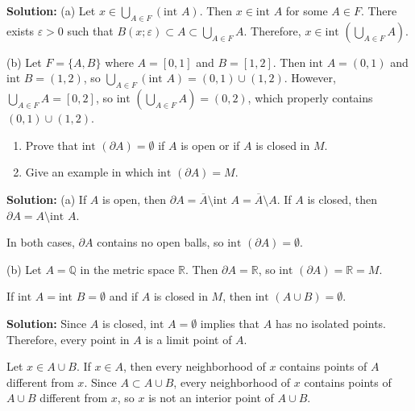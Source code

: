 \textbf{Solution:} 
(a) Let $x \in \bigcup_{A \in F} (\text{int } A)$. Then $x \in \text{int } A$ for some $A \in F$. There exists $\varepsilon > 0$ such that $B(x;\varepsilon) \subset A \subset \bigcup_{A \in F} A$. Therefore, $x \in \text{int }(\bigcup_{A \in F} A)$.

(b) Let $F = \{A, B\}$ where $A = [0,1]$ and $B = [1,2]$. Then $\text{int } A = (0,1)$ and $\text{int } B = (1,2)$, so $\bigcup_{A \in F} (\text{int } A) = (0,1) \cup (1,2)$. However, $\bigcup_{A \in F} A = [0,2]$, so $\text{int }(\bigcup_{A \in F} A) = (0,2)$, which properly contains $(0,1) \cup (1,2)$.

\begin{problembox}
\begin{enumerate}[label=\alph*)]
\item Prove that \(\text{int } (\partial A) = \emptyset\) if \( A \) is open or if \( A \) is closed in \( M \).
\item Give an example in which \(\text{int } (\partial A) = M\).
\end{enumerate}
\end{problembox}

\textbf{Solution:} 
(a) If $A$ is open, then $\partial A = \overline{A} \setminus \text{int } A = \overline{A} \setminus A$. If $A$ is closed, then $\partial A = A \setminus \text{int } A$.

In both cases, $\partial A$ contains no open balls, so $\text{int } (\partial A) = \emptyset$.

(b) Let $A = \mathbb{Q}$ in the metric space $\mathbb{R}$. Then $\partial A = \mathbb{R}$, so $\text{int } (\partial A) = \mathbb{R} = M$.

\begin{problembox}
If \(\text{int } A = \text{int } B = \emptyset\) and if \(A\) is closed in \(M\), then \(\text{int } (A \cup B) = \emptyset\).
\end{problembox}

\textbf{Solution:} Since $A$ is closed, $\text{int } A = \emptyset$ implies that $A$ has no isolated points. Therefore, every point in $A$ is a limit point of $A$.

Let $x \in A \cup B$. If $x \in A$, then every neighborhood of $x$ contains points of $A$ different from $x$. Since $A \subset A \cup B$, every neighborhood of $x$ contains points of $A \cup B$ different from $x$, so $x$ is not an interior point of $A \cup B$.

